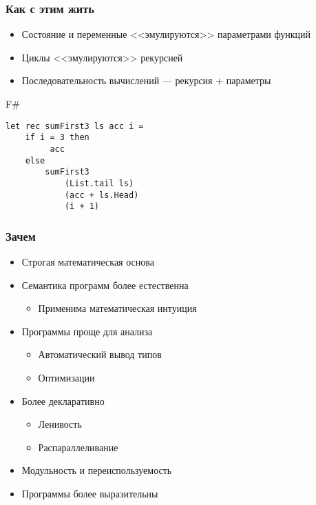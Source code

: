 \documentclass[xetex,mathserif,serif]{beamer}
\begin{document}
	\begin{frame}[fragile]
		\frametitle{Как с этим жить}
		\begin{itemize}
			\item Состояние и переменные <<эмулируются>> параметрами функций
			\item Циклы <<эмулируются>> рекурсией
			\item Последовательность вычислений --- рекурсия + параметры
		\end{itemize}
		\begin{exampleblock}{F\#}
			\begin{verbatim}
let rec sumFirst3 ls acc i =
    if i = 3 then 
         acc 
    else 
        sumFirst3 
            (List.tail ls) 
            (acc + ls.Head) 
            (i + 1)
            \end{verbatim}
		\end{exampleblock}
\end{frame}

	\begin{frame}
		\frametitle{Зачем}
		\begin{itemize}
			\item Строгая математическая основа
			\item Семантика программ более естественна
			\begin{itemize}
				\item Применима математическая интуиция
			\end{itemize}
			\item Программы проще для анализа
			\begin{itemize}
				\item Автоматический вывод типов
				\item Оптимизации
			\end{itemize}
			\item Более декларативно
			\begin{itemize}
				\item Ленивость
				\item Распараллеливание
			\end{itemize}
			\item Модульность и переиспользуемость
			\item Программы более выразительны
		\end{itemize}
	\end{frame}
	
\end{document}

